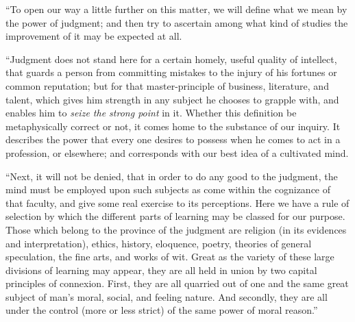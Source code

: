 ``To open our way a little further on this matter, we will
define what we mean by the power of judgment; and then try to
ascertain among what kind of studies the improvement of it may be
expected at all.

``Judgment does not stand here for a certain homely, useful
quality of intellect, that guards a person from committing mistakes to
the injury of his fortunes or common reputation; but for that
master-principle of business, literature, and talent, which gives him
strength in any subject he chooses to grapple with, and enables him to
\emph{seize the strong point} in it. Whether this definition be
metaphysically correct or not, it comes home to the substance of our
inquiry. It describes the power that every one desires to possess when
he comes to act in a profession, or elsewhere; and corresponds with
our best idea of a cultivated mind.

``Next, it will not be denied, that in order to do any good to
the judgment, the mind must be employed upon such subjects as come
within the cognizance of that faculty, and give some real exercise to
its perceptions. Here we have a rule of selection by which the
different parts of learning may be classed for our purpose. Those
which belong to the province of the judgment are religion (in
its evidences and interpretation), ethics, history, eloquence, poetry,
theories of general speculation, the fine arts, and works of wit.
Great as the variety of these large divisions of learning may appear,
they are all held in union by two capital principles of connexion.
First, they are all quarried out of one and the same great subject of
man's moral, social, and feeling nature. And secondly, they are all
under the control (more or less strict) of the same power of moral
reason.''

